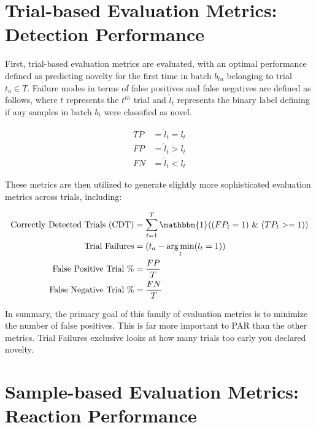\documentclass[11pt]{article}
\DeclareMathOperator*{\argmin}{arg\,min}
\begin{document}
\section{Trial-based Evaluation Metrics: Detection Performance}%
\label{sec:trial_based_evaluation_metrics}

First, trial-based evaluation metrics are evaluated, with an optimal performance defined as predicting novelty for the first time in batch $b_{ta}$ belonging to trial $t_a \in T$. Failure modes in terms of false positives and false negatives are defined as follows, where $t$ represents the $t^{th}$ trial and $\hat{l}_t$ represents the binary label defining if any samples in batch $b_t$ were classified as novel.

\begin{equation}
    \begin{aligned}
      TP &= \hat{l}_t = l_t \\
      FP &= \hat{l}_t > l_t \\
      FN &= \hat{l}_t < l_t
    \end{aligned}
\end{equation}

These metrics are then utilized to generate slightly more sophisticated evaluation metrics across trials, including:

\begin{equation}
    \begin{aligned}
      \text{Correctly Detected Trials (CDT)} &= \sum^{T}_{t = 1} \mathbbm{1}( (FP_{t} = 1) \ \& \ (TP_t >= 1)) \\
      \text{Trial Failures} &= (t_a - \argmin_t(l_t = 1)) \\
      \text{False Positive Trial \%} &= \frac{FP}{T} \\
      \text{False Negative Trial \%} &= \frac{FN}{T}
    \end{aligned}
\end{equation} 

In summary, the primary goal of this family of evaluation metrics is to minimize the number of false positives. This is far more important to PAR than the other metrics. Trial Failures exclusive looks at how many trials too early you declared novelty.

\section{Sample-based Evaluation Metrics: Reaction Performance}%
\label{sec:sample_based_evaluation_metrics_reaction_performance}
\end{document}
